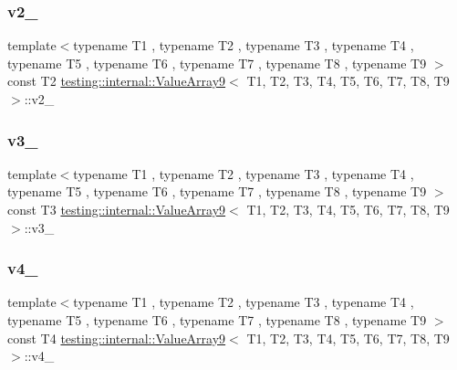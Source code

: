\subsubsection{\texorpdfstring{v2\_}{v2\_}}
{\footnotesize\ttfamily template$<$typename T1 , typename T2 , typename T3 , typename T4 , typename T5 , typename T6 , typename T7 , typename T8 , typename T9 $>$ \\
const T2 \mbox{\hyperlink{classtesting_1_1internal_1_1_value_array9}{testing\+::internal\+::\+Value\+Array9}}$<$ T1, T2, T3, T4, T5, T6, T7, T8, T9 $>$\+::v2\+\_\+\hspace{0.3cm}{\ttfamily [private]}}

\mbox{\label{classtesting_1_1internal_1_1_value_array9_a4b6d059b497f47f5baa1ae5b94a30d49}} 
\subsubsection{\texorpdfstring{v3\_}{v3\_}}
{\footnotesize\ttfamily template$<$typename T1 , typename T2 , typename T3 , typename T4 , typename T5 , typename T6 , typename T7 , typename T8 , typename T9 $>$ \\
const T3 \mbox{\hyperlink{classtesting_1_1internal_1_1_value_array9}{testing\+::internal\+::\+Value\+Array9}}$<$ T1, T2, T3, T4, T5, T6, T7, T8, T9 $>$\+::v3\+\_\+\hspace{0.3cm}{\ttfamily [private]}}

\mbox{\label{classtesting_1_1internal_1_1_value_array9_a4f6ae3ac44cfd019b86abb589be87e73}} 
\subsubsection{\texorpdfstring{v4\_}{v4\_}}
{\footnotesize\ttfamily template$<$typename T1 , typename T2 , typename T3 , typename T4 , typename T5 , typename T6 , typename T7 , typename T8 , typename T9 $>$ \\
const T4 \mbox{\hyperlink{classtesting_1_1internal_1_1_value_array9}{testing\+::internal\+::\+Value\+Array9}}$<$ T1, T2, T3, T4, T5, T6, T7, T8, T9 $>$\+::v4\+\_\+\hspace{0.3cm}{\ttfamily [private]}}

